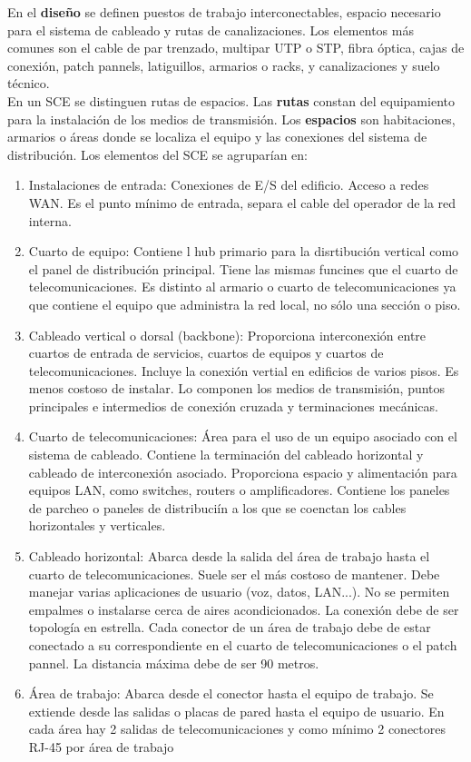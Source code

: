 \documentclass[10pt,portrait, twocolumn]{article}
\begin{document}
En el \textbf{diseño} se definen puestos de trabajo interconectables, espacio necesario para el sistema de cableado y rutas de canalizaciones. Los elementos más comunes son el cable de par trenzado, multipar UTP o STP, fibra óptica, cajas de conexión, patch pannels, latiguillos, armarios o racks, y canalizaciones y suelo técnico.\\

En un SCE se distinguen rutas de espacios. Las \textbf{rutas} constan del equipamiento para la instalación de los medios de transmisión. Los \textbf{espacios} son habitaciones, armarios o áreas donde se localiza el equipo y las conexiones del sistema de distribución. Los elementos del SCE se agruparían en: 

	\begin{enumerate}
		\item Instalaciones de entrada: Conexiones de E/S del edificio. Acceso a redes WAN. Es el punto mínimo de entrada, separa el cable del operador de la red interna.
		\item Cuarto de equipo: Contiene l hub primario para la disrtibución vertical como el panel de distribución principal. Tiene las mismas funcines que el cuarto de telecomunicaciones. Es distinto al armario o cuarto de telecomunicaciones ya que contiene el equipo que administra la red local, no sólo una sección o piso.
		\item Cableado vertical o dorsal (backbone): Proporciona interconexión entre cuartos de entrada de servicios, cuartos de equipos y cuartos de telecomunicaciones. Incluye la conexión vertial en edificios de varios pisos. Es menos costoso de instalar. Lo componen los medios de transmisión, puntos principales e intermedios de conexión cruzada y terminaciones mecánicas.
		\item Cuarto de telecomunicaciones: Área para el uso de un equipo asociado con el sistema de cableado. Contiene la terminación del cableado horizontal y cableado de interconexión asociado. Proporciona espacio y alimentación para equipos LAN, como switches, routers o amplificadores. Contiene los paneles de parcheo o paneles de distribuciín a los que se coenctan los cables horizontales y verticales.
		\item Cableado horizontal: Abarca desde la salida del área de trabajo hasta el cuarto de telecomunicaciones. Suele ser el más costoso de mantener. Debe manejar varias aplicaciones de usuario (voz, datos, LAN...). No se permiten empalmes o instalarse cerca de aires acondicionados. La conexión debe de ser topología en estrella. Cada conector de un área de trabajo debe de estar conectado a su correspondiente en el cuarto de telecomunicaciones o el patch pannel. La distancia máxima debe de ser 90 metros.
		\item Área de trabajo: Abarca desde el conector hasta el equipo de trabajo. Se extiende desde las salidas o placas de pared hasta el equipo de usuario. En cada área hay 2 salidas de telecomunicaciones y como mínimo 2 conectores RJ-45 por área de trabajo
	\end{enumerate}
 
\end{document}
